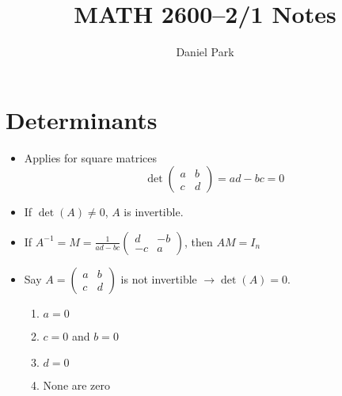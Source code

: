\documentclass[11pt]{article}
\title{MATH 2600--2/1 Notes}
\author{Daniel Park}
\begin{document}
\maketitle

\section*{Determinants}
\begin{itemize}
    \item Applies for square matrices
    \[
        \det\begin{pmatrix}
            a & b \\
            c & d
        \end{pmatrix} = ad - bc = 0
    \]

    \item If \(\det(A) \neq 0\), \(A\) is invertible.
    \item If \(A^{-1} = M = \frac{1}{ad - bc}
    \begin{pmatrix}
        d & -b \\
        -c & a
    \end{pmatrix}
    \), then \(AM = I_n\)
    
    \item Say \(A =
    \begin{pmatrix}
        a & b \\
        c & d
    \end{pmatrix}\) is not invertible \(\rightarrow \det(A) = 0\).
    \begin{enumerate}
        \item \(a = 0\)
        \item \(c = 0\) and \(b = 0\)
        \item \(d = 0\)
        \item None are zero
    \end{enumerate}
\end{itemize}
\end{document}
